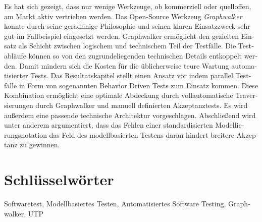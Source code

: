 \begin{otherlanguage}{ngerman}
Es hat sich gezeigt, dass nur wenige Werkzeuge, ob kommerziell oder quelloffen, am Markt aktiv vertrieben werden. Das Open-Source Werkzeug \textit{Graphwalker} konnte durch seine geradlinige Philosophie und seinen klaren Einsatzzweck sehr gut im Fallbeispiel eingesetzt werden. Graphwalker ermöglicht den gezielten Einsatz als Schicht zwischen logischem und technischem Teil der Testfälle. Die Testabläufe können so von den zugrundeliegenden technischen Details entkoppelt werden. Damit mindern sich die Kosten für die üblicherweise teure Wartung automatisierter Tests. Das Resultatskapitel stellt einen Ansatz vor indem parallel Testfälle in Form von sogenannten Behavior Driven Tests zum Einsatz kommen. Diese Kombination ermöglicht eine optimale Abdeckung durch vollautomatische Traversierungen durch Graphwalker und manuell definierten Akzeptanztests. Es wird außerdem eine passende technische Architektur vorgeschlagen. Abschließend wird unter anderem argumentiert, dass das Fehlen einer standardisierten Modellierungsnotation das Feld des modellbasierten Testens daran hindert breitere Akzeptanz zu gewinnen.

\bigskip

  \section*{Schlüsselwörter}
  Softwaretest, Modellbasiertes Testen, Automatisiertes Software Testing, Graphwalker, UTP

\end{otherlanguage}


